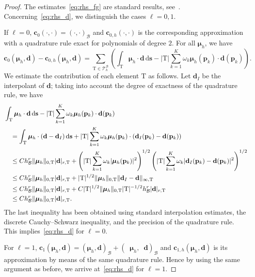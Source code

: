 \documentclass[oneside]{amsart} %
\DeclareMathOperator{\grads}{\boldsymbol\nabla_s}
\newcommand\B{\mathcal B} %
\renewcommand\d{\mathbf{d}} %
\renewcommand\c{\mathbf{c}} %
\newcommand\s{\mathbf{s}} %
\newcommand\mmu{{\boldsymbol\mu}} %
\newcommand\ds{\mathrm{d}\s} %
\newcommand\T{\mathcal{T}} %
\newcommand\quadnode{\mathbf{p}}
\newcommand\quadweigth{\omega}
\newcommand\tri{\mathrm{T}} %
\newcommand{\crhsZ}[2]{\c_{0,h}(#1,#2)}
\newcommand{\crhsU}[2]{\c_{1,h}(#1,#2)}
\newcommand\DB{\begin{color}{black}}
\newcommand\BD{\end{color}}
\begin{document}
	\begin{proof}
		The estimates~\eqref{eq:rhs_fg} are standard results, see~\cite[Chap. 4, Sect. 4.1]{ciarlet2002finite}. Concerning~\eqref{eq:rhs_d}, we distinguish the cases $\ell=0,1$. 
		
		If $\ell=0$, $\c_0(\cdot,\cdot)=(\cdot,\cdot)_\B$ and $\crhsZ{\cdot}{\cdot}$ is the corresponding approximation with a quadrature rule exact for polynomials of degree $2$. For all $\mmu_h$, we have
		\begin{equation*}
			\c_0(\mmu_h,\d) - \crhsZ{\mmu_h}{\d} = \sum_{\tri\in\T^\B_h} \left( \int_\tri \mmu_h\cdot\d\,\ds - |\tri|\sum_{k=1}^K \quadweigth_k\mmu_h(\quadnode_k)\cdot\d(\quadnode_k) \right).
		\end{equation*}
		We estimate the contribution of each element $\tri$ as follows. Let $\d_I$ be the interpolant of $\d$; taking into account the degree of exactness of the quadrature rule, we have 
		\[
		\begin{aligned}
			&\int_\tri \mmu_h\cdot\d\,\ds - |\tri|\sum_{k=1}^K \quadweigth_k\mmu_h(\quadnode_k)\cdot\d(\quadnode_k)\\
			&\quad= \int_\tri \mmu_h\cdot(\d-\d_I)\,\ds + |\tri|\sum_{k=1}^K \quadweigth_k\mmu_h(\quadnode_k)\cdot(\d_I(\quadnode_k)-\d(\quadnode_k))\\
			&\DB\quad\le Ch_\B^r \|\mmu_h\|_{0,\tri}|\d|_{r,\tri}+
			\left(|\tri|\sum_{k=1}^K\quadweigth_k|\mmu_h(\quadnode_k)|^2\right)^{1/2}
			\left(|\tri|\sum_{k=1}^K\quadweigth_k|\d_I(\quadnode_k)-\d(\quadnode_k)|^2\right)^{1/2}\BD\\
			&\DB\quad\le Ch_\B^r \|\mmu_h\|_{0,\tri}|\d|_{r,\tri}+
			|\tri|^{1/2}\|\mmu_h\|_{0,\tri}\|\d_I-\d\|_{\infty,\tri}\BD\\
			&\DB\quad\le Ch_\B^r \|\mmu_h\|_{0,\tri}|\d|_{r,\tri}+
			C|\tri|^{1/2}\|\mmu_h\|_{0,\tri}|\tri|^{-1/2}h_\B^r|\d|_{r,\tri}\BD\\
			&\DB\quad\le Ch_\B^r\|\mmu_h\|_{0,\tri}|\d|_{r,\tri}.\BD
		\end{aligned}
		\]
		The last inequality has been obtained using standard interpolation estimates,
		the discrete Cauchy--Schwarz inequality, and the precision of the
		quadrature rule. This implies~\eqref{eq:rhs_d} for $\ell=0$.
		
		For $\ell=1$, $\c_1(\mmu_h,\d)=(\mmu_h,\d)_\B+(\grads\mmu_h,\grads\d)_\B$ and $\crhsU{\mmu_h}{\d}$ is its approximation by means of the same quadrature rule. Hence by using the same argument as before, we arrive at~\eqref{eq:rhs_d} for $\ell=1$.
	\end{proof}
	
\end{document}
